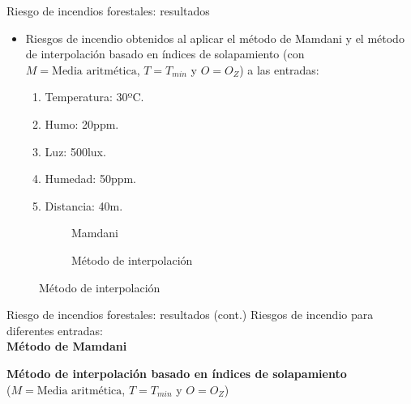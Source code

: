 \documentclass{beamer}
\begin{document}
\begin{frame}{Riesgo de incendios forestales: resultados}
\begin{itemize}
\item Riesgos de incendio obtenidos al aplicar el método de Mamdani y el método de interpolación basado en índices de solapamiento (con $M = \text{Media aritmética}$, $T = T_{min}$ y $O = O_Z$) a las entradas:
	\begin{enumerate}
		\item Temperatura: 30ºC.
		\item Humo: 20ppm.
		\item Luz: 500lux.
		\item Humedad: 50ppm.
		\item Distancia: 40m.
	\end{enumerate}
\end{itemize}
\vspace{0.2cm}
\begin{figure}[H]
	\centering
	\begin{subfigure}[b]{0.45\textwidth}
		\caption{Mamdani}
		\setlength\figureheight{2cm}
		\setlength\figurewidth{4.25cm}
		
	\end{subfigure}
	\qquad
	\begin{subfigure}[b]{0.45\textwidth}
		\caption{Método de interpolación}
		\setlength\figureheight{2cm}
		\setlength\figurewidth{4.25cm}
		
	\end{subfigure}
\end{figure}
\end{frame}

\begin{frame}{Riesgo de incendios forestales: resultados (cont.)}
Riesgos de incendio para diferentes entradas: \\
\vspace{0.3cm}
\textbf{Método de Mamdani}
\begin{center}
	\tiny
	
\end{center}
\vspace{0.5cm}
\textbf{Método de interpolación basado en índices de solapamiento} \\
{\footnotesize   ($M = \text{Media aritmética}$, $T = T_{min}$ y $O = O_Z$)}
\begin{center}
	\tiny
    
\end{center}
\end{frame}
\end{document}
